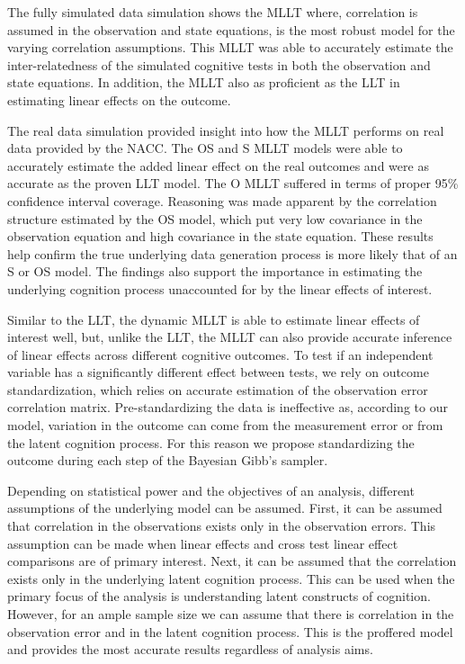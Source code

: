 \documentclass[
]{article}
\begin{document}
The fully simulated data simulation shows the MLLT where, correlation is assumed in the observation and state equations, is the most robust model for the varying correlation assumptions. This MLLT was able to accurately estimate the inter-relatedness of the simulated cognitive tests in both the observation and state equations. In addition, the MLLT also as proficient as the LLT in estimating linear effects on the outcome.

The real data simulation provided insight into how the MLLT performs on real data provided by the NACC. The OS and S MLLT models were able to accurately estimate the added linear effect on the real outcomes and were as accurate as the proven LLT model. The O MLLT suffered in terms of proper 95\% confidence interval coverage. Reasoning was made apparent by the correlation structure estimated by the OS model, which put very low covariance in the observation equation and high covariance in the state equation. These results help confirm the true underlying data generation process is more likely that of an S or OS model. The findings also support the importance in estimating the underlying cognition process unaccounted for by the linear effects of interest.

Similar to the LLT, the dynamic MLLT is able to estimate linear effects of interest well, but, unlike the LLT, the MLLT can also provide accurate inference of linear effects across different cognitive outcomes. To test if an independent variable has a significantly different effect between tests, we rely on outcome standardization, which relies on accurate estimation of the observation error correlation matrix. Pre-standardizing the data is ineffective as, according to our model, variation in the outcome can come from the measurement error or from the latent cognition process. For this reason we propose standardizing the outcome during each step of the Bayesian Gibb's sampler.

Depending on statistical power and the objectives of an analysis, different assumptions of the underlying model can be assumed. First, it can be assumed that correlation in the observations exists only in the observation errors. This assumption can be made when linear effects and cross test linear effect comparisons are of primary interest. Next, it can be assumed that the correlation exists only in the underlying latent cognition process. This can be used when the primary focus of the analysis is understanding latent constructs of cognition. However, for an ample sample size we can assume that there is correlation in the observation error and in the latent cognition process. This is the proffered model and provides the most accurate results regardless of analysis aims.
\end{document}
